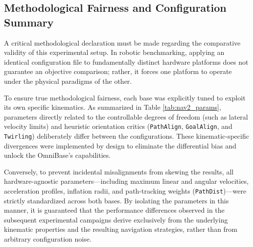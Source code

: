 \subsection{Methodological Fairness and Configuration Summary}
\label{subsec:fairness_summary}

A critical methodological declaration must be made regarding the comparative validity of this experimental setup. In robotic benchmarking, applying an identical configuration file to fundamentally distinct hardware platforms does not guarantee an objective comparison; rather, it forces one platform to operate under the physical paradigms of the other. 

To ensure true methodological fairness, each base was explicitly tuned to exploit its own specific kinematics. As summarized in Table \ref{tab:nav2_params}, parameters directly related to the controllable degrees of freedom (such as lateral velocity limits) and heuristic orientation critics (\texttt{PathAlign}, \texttt{GoalAlign}, and \texttt{Twirling}) deliberately differ between the configurations. These kinematic-specific divergences were implemented by design to eliminate the differential bias and unlock the OmniBase's capabilities. 

Conversely, to prevent incidental misalignments from skewing the results, all hardware-agnostic parameters—including maximum linear and angular velocities, acceleration profiles, inflation radii, and path-tracking weights (\texttt{PathDist})—were strictly standardized across both bases. By isolating the parameters in this manner, it is guaranteed that the performance differences observed in the subsequent experimental campaigns derive exclusively from the underlying kinematic properties and the resulting navigation strategies, rather than from arbitrary configuration noise.

